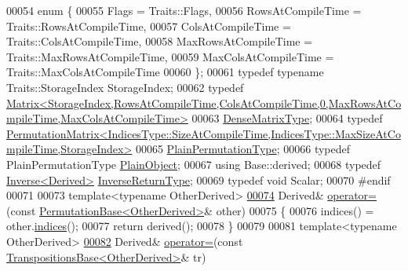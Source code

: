 \begin{DoxyCode}
00054     \textcolor{keyword}{enum} \{
00055       Flags = Traits::Flags,
00056       RowsAtCompileTime = Traits::RowsAtCompileTime,
00057       ColsAtCompileTime = Traits::ColsAtCompileTime,
00058       MaxRowsAtCompileTime = Traits::MaxRowsAtCompileTime,
00059       MaxColsAtCompileTime = Traits::MaxColsAtCompileTime
00060     \};
00061     \textcolor{keyword}{typedef} \textcolor{keyword}{typename} Traits::StorageIndex StorageIndex;
00062     \textcolor{keyword}{typedef} 
      \hyperlink{group___core___module_class_eigen_1_1_matrix}{Matrix<StorageIndex,RowsAtCompileTime,ColsAtCompileTime,0,MaxRowsAtCompileTime,MaxColsAtCompileTime>}
00063             \hyperlink{group___core___module_class_eigen_1_1_matrix}{DenseMatrixType};
00064     \textcolor{keyword}{typedef} 
      \hyperlink{group___core___module_class_eigen_1_1_permutation_matrix}{PermutationMatrix<IndicesType::SizeAtCompileTime,IndicesType::MaxSizeAtCompileTime,StorageIndex>}
00065             \hyperlink{group___core___module_class_eigen_1_1_permutation_matrix}{PlainPermutationType};
00066     \textcolor{keyword}{typedef} PlainPermutationType \hyperlink{group___core___module_class_eigen_1_1_permutation_matrix}{PlainObject};
00067     \textcolor{keyword}{using} Base::derived;
00068     \textcolor{keyword}{typedef} \hyperlink{class_eigen_1_1_inverse}{Inverse<Derived>} \hyperlink{class_eigen_1_1_inverse}{InverseReturnType};
00069     \textcolor{keyword}{typedef} \textcolor{keywordtype}{void} Scalar;
00070 \textcolor{preprocessor}{    #endif}
00071 
00073     \textcolor{keyword}{template}<\textcolor{keyword}{typename} OtherDerived>
\hyperlink{group___core___module_a8e15540549c5a4e2d5b3b426fef8fbcf}{00074}     Derived& \hyperlink{group___core___module_a8e15540549c5a4e2d5b3b426fef8fbcf}{operator=}(\textcolor{keyword}{const} \hyperlink{group___core___module_class_eigen_1_1_permutation_base}{PermutationBase<OtherDerived>}& other)
00075     \{
00076       indices() = other.\hyperlink{group___core___module_adec727546b6882ecaa57e76d084951c5}{indices}();
00077       \textcolor{keywordflow}{return} derived();
00078     \}
00079 
00081     \textcolor{keyword}{template}<\textcolor{keyword}{typename} OtherDerived>
\hyperlink{group___core___module_acaa7cce9ea62c811cec12e86dbb2f0de}{00082}     Derived& \hyperlink{group___core___module_acaa7cce9ea62c811cec12e86dbb2f0de}{operator=}(\textcolor{keyword}{const} \hyperlink{class_eigen_1_1_transpositions_base}{TranspositionsBase<OtherDerived>}& tr)

\end{DoxyCode}
